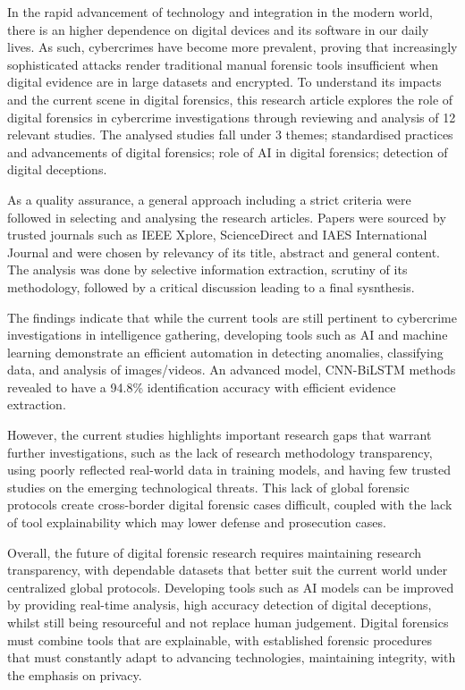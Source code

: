 \documentclass[12pt,a4paper]{article}
\begin{document}
\begin{justify}

    
In the rapid advancement of technology and integration in the modern world, there is an higher dependence on digital devices and its software in our daily lives. As such, cybercrimes have become more prevalent, proving that increasingly sophisticated attacks render traditional manual forensic tools insufficient when digital evidence are in large datasets and encrypted. To understand its impacts and the current scene in digital forensics, this research article explores the role of digital forensics in cybercrime investigations through reviewing and analysis of 12 relevant studies. The analysed studies fall under 3 themes; standardised practices and advancements of digital forensics; role of AI in digital forensics; detection of digital deceptions. 

As a quality assurance, a general approach including a strict criteria were followed in selecting and analysing the research articles. Papers were sourced by trusted journals such as IEEE Xplore, ScienceDirect and IAES International Journal and were chosen by relevancy of its title, abstract and general content. The analysis was done by selective information extraction, scrutiny of its methodology, followed by a critical discussion leading to a final sysnthesis.

The findings indicate that while the current tools are still pertinent to cybercrime investigations in intelligence gathering, developing tools such as AI and machine learning demonstrate an efficient automation in detecting anomalies, classifying data, and analysis of images/videos. An advanced model, CNN-BiLSTM methods revealed to have a 94.8\% identification accuracy with efficient evidence extraction. 

However, the current studies highlights important research gaps that warrant further investigations, such as the lack of research methodology transparency, using poorly reflected real-world data in training models, and having few trusted studies on the emerging technological threats. 
This lack of global forensic protocols create cross-border digital forensic cases difficult, coupled with the lack of tool explainability which may lower defense and prosecution cases. 

Overall, the future of digital forensic research requires maintaining research transparency, with dependable datasets that better suit the current world under centralized global protocols. Developing tools such as AI models can be improved by providing real-time analysis, high accuracy detection of digital deceptions, whilst still being resourceful and not replace human judgement. Digital forensics must combine tools that are explainable, with established forensic procedures that must constantly adapt to advancing technologies,  maintaining integrity, with the emphasis on privacy. 




\end{justify}
\end{document}

